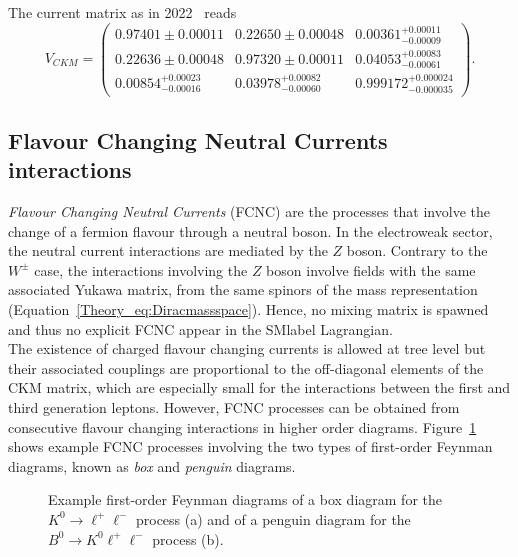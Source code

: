 The current matrix as in 2022~\cite{pdg} reads
\begin{equation}
        V_{CKM}= \begin{pmatrix} 0.97401 \pm 0.00011 & 0.22650 \pm 0.00048 & 0.00361^{+0.00011}_{-0.00009} \\ 0.22636 \pm 0.00048 & 0.97320 \pm 0.00011 & 0.04053^{+0.00083}_{-0.00061} \\ 0.00854^{+0.00023}_{-0.00016} & 0.03978^{+0.00082}_{-0.00060} & 0.999172^{+0.000024}_{-0.000035} \end{pmatrix}.
\end{equation}

\subsection{Flavour Changing Neutral Currents interactions}
\label{Theory_SMsubsec:FCNC}
\textit{Flavour Changing Neutral Currents} (FCNC) are the processes that involve the change of a fermion flavour through a neutral boson. In the electroweak sector, the neutral current interactions are mediated by the $Z$ boson. Contrary to the $W^\pm$ case, the interactions involving the $Z$ boson involve fields with the same associated Yukawa matrix, from the same spinors of the mass representation (Equation~\ref{Theory_eq:Diracmassspace}). Hence, no mixing matrix is spawned and thus no explicit FCNC appear in the \acrshort{SMlabel} Lagrangian.\\

The existence of charged flavour changing currents is allowed at tree level but their associated couplings are proportional to the off-diagonal elements of the CKM matrix, which are especially small for the interactions between the first and third generation leptons. However, FCNC processes can be obtained from consecutive flavour changing interactions in higher order diagrams. Figure~\ref{figSM:FCNCdiagrams} shows example FCNC processes involving the two types of first-order Feynman diagrams, known as \textit{box} and \textit{penguin} diagrams.

\begin{figure}[htbp]
    \RawFloats
    \begin{center}
        \quad
        \caption{
            Example first-order Feynman diagrams of a box diagram for the $K^0\to\ell^+\ell^-$ process (a) and of a penguin diagram for the $B^0\to K^0\ell^+\ell^-$ process (b). 
    }
    \label{figSM:FCNCdiagrams}
    \end{center}
\end{figure}

